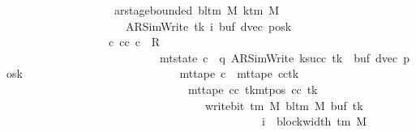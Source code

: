 \begin{isabellebody}
\ \ \ \ \ \ \ \ \ \ \ \ \ \ \ \ \ \ \ ar{\isacharunderscore}{\kern0pt}stage{\isacharunderscore}{\kern0pt}bounded\ {\isacharparenleft}{\kern0pt}bl{\isacharunderscore}{\kern0pt}tm\ M{\isacharparenright}{\kern0pt}\ {\isacharparenleft}{\kern0pt}k{\isacharunderscore}{\kern0pt}tm\ M{\isacharparenright}{\kern0pt}\isanewline
\ \ \ \ \ \ \ \ \ \ \ \ \ \ \ \ \ \ \ \ \ {\isacharparenleft}{\kern0pt}AR{\isacharunderscore}{\kern0pt}SimWrite{\isacharcomma}{\kern0pt}\ tk{\isacharcomma}{\kern0pt}\ i{\isacharcomma}{\kern0pt}\ buf{\isacharcomma}{\kern0pt}\ dvec{\isacharcomma}{\kern0pt}\ posk{\isacharparenright}{\kern0pt}\ {\isasymrbrakk}\isanewline
\ \ \ \ \ \ \ \ \ \ \ \ \ \ \ \ \ {\isasymLongrightarrow}\ {\isasymexists}c{\isacharprime}{\kern0pt}{\isacharprime}{\kern0pt}{\isachardot}{\kern0pt}\ {\isacharparenleft}{\kern0pt}cc{\isacharcomma}{\kern0pt}\ c{\isacharprime}{\kern0pt}{\isacharprime}{\kern0pt}{\isacharparenright}{\kern0pt}\ {\isasymin}\ R{\isacharprime}{\kern0pt}\isanewline
\ \ \ \ \ \ \ \ \ \ \ \ \ \ \ \ \ \ \ \ \ \ \ \ \ \ {\isasymand}\ mt{\isacharunderscore}{\kern0pt}state\ c{\isacharprime}{\kern0pt}{\isacharprime}{\kern0pt}\ {\isacharequal}{\kern0pt}\ {\isacharparenleft}{\kern0pt}q{\isacharcomma}{\kern0pt}\ AR{\isacharunderscore}{\kern0pt}SimWrite{\isacharcomma}{\kern0pt}\ k{\isacharunderscore}{\kern0pt}succ\ tk{\isacharcomma}{\kern0pt}\ {}{\isacharcomma}{\kern0pt}\ buf{\isacharcomma}{\kern0pt}\ dvec{\isacharcomma}{\kern0pt}\ posk{\isacharparenright}{\kern0pt}\isanewline
\ \ \ \ \ \ \ \ \ \ \ \ \ \ \ \ \ \ \ \ \ \ \ \ \ \ {\isasymand}\ mt{\isacharunderscore}{\kern0pt}tape\ c{\isacharprime}{\kern0pt}{\isacharprime}{\kern0pt}\ {\isacharequal}{\kern0pt}\ {\isacharparenleft}{\kern0pt}mt{\isacharunderscore}{\kern0pt}tape\ cc{\isacharparenright}{\kern0pt}{\isacharparenleft}{\kern0pt}tk\ {\isacharcolon}{\kern0pt}{\isacharequal}{\kern0pt}\isanewline
\ \ \ \ \ \ \ \ \ \ \ \ \ \ \ \ \ \ \ \ \ \ \ \ \ \ \ \ \ \ \ \ {\isacharparenleft}{\kern0pt}mt{\isacharunderscore}{\kern0pt}tape\ cc\ tk{\isacharparenright}{\kern0pt}{\isacharparenleft}{\kern0pt}mt{\isacharunderscore}{\kern0pt}pos\ cc\ tk\ {\isacharcolon}{\kern0pt}{\isacharequal}{\kern0pt}\isanewline
\ \ \ \ \ \ \ \ \ \ \ \ \ \ \ \ \ \ \ \ \ \ \ \ \ \ \ \ \ \ \ \ \ \ \ write{\isacharunderscore}{\kern0pt}bit\ {\isacharparenleft}{\kern0pt}{\isasymGamma}{\isacharunderscore}{\kern0pt}tm\ M{\isacharparenright}{\kern0pt}\ {\isacharparenleft}{\kern0pt}bl{\isacharunderscore}{\kern0pt}tm\ M{\isacharparenright}{\kern0pt}\ {\isacharparenleft}{\kern0pt}buf\ tk{\isacharparenright}{\kern0pt}\isanewline
\ \ \ \ \ \ \ \ \ \ \ \ \ \ \ \ \ \ \ \ \ \ \ \ \ \ \ \ \ \ \ \ \ \ \ \ \ \ \ \ \ \ \ \ \ {\isacharparenleft}{\kern0pt}i\ {\isacharminus}{\kern0pt}\ block{\isacharunderscore}{\kern0pt}width\ {\isacharparenleft}{\kern0pt}{\isasymGamma}{\isacharunderscore}{\kern0pt}tm\ M{\isacharparenright}{\kern0pt}{\isacharparenright}{\kern0pt}{\isacharparenright}{\kern0pt}{\isacharparenright}{\kern0pt}\isanewline

\end{isabellebody}
